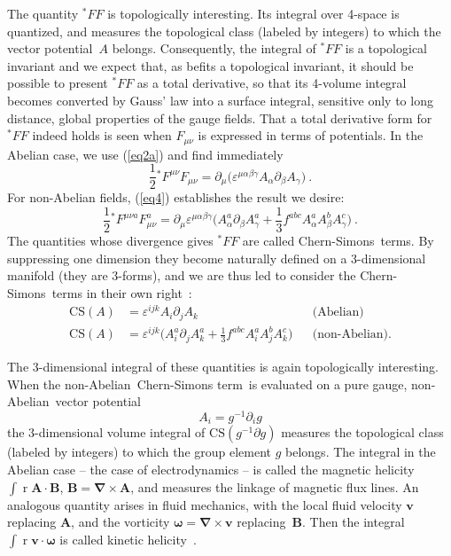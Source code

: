 \documentclass[a4paper,12pt,twoside]{article}
\newcommand{\rd}[1]{\mathop{\mathrm{d}#1}}
\newcommand{\fract}[2]{{\textstyle\frac{#1}{#2}}}
\newcommand{\grad}{\vec\nabla}
\newcommand{\nA}{non-Abelian}
\newcommand{\CS}{Chern-Simons}
\newcommand{\CSt}{Chern-Simons term}
\newcommand{\mn}{{\mu\nu}}
\newcommand{\pp}[1]{\partial_{#1}}
\newcommand{\numeq}[2]{\begin{equation}
#2
\label{#1}
\end{equation}}
\newcommand{\refeq}[1]{(\ref{#1})}
\let\vec\boldsymbol
\let\eps\varepsilon
\begin{document}
The quantity $ {}^*\!FF$ is topologically interesting. Its integral over 4-space is
quantized, and measures the topological class (labeled by integers) to which the
vector potential~$A$ belongs. Consequently, the  integral of $ {}^*\!FF$ is a
topological invariant and we expect that, as befits a topological invariant, it should be
possible to present
$ {}^*\!FF$ as a total derivative, so that its 4-volume integral becomes converted by
Gauss' law into a surface integral, sensitive only to long distance, global properties of
the gauge fields. That a total derivative form for
${}^*\!FF$ indeed holds is seen when $F_\mn$ is expressed in terms of potentials. In
the Abelian case, we use \refeq{eq2a} and find immediately  
\numeq{eq5}{
\fract12  {}^*\!F^\mn F_\mn  = \pp \mu \bigl(\eps^{\mu\alpha\beta\gamma}
A_\alpha \pp\beta A_\gamma \bigr)\ .
 }
For non-Abelian fields, \refeq{eq4} establishes the result we desire:
\numeq{eq6}{
\fract12 {}^*\!F^{\mn a} F_\mn^a   = \pp\mu \eps^{\mu\alpha\beta\gamma}
\bigl( A_\alpha^a\pp\beta A_\gamma^a + \fract13 f^{abc} A_\alpha^a A_\beta^b
A_\gamma^c
\bigr)\ .
}
The quantities whose divergence gives ${}^*\!FF$ are called \CS\ terms. By
suppressing one dimension they become naturally defined on a 3-dimensional
manifold (they are 3-forms), and we are thus led to consider the \CS\ terms in their
own right~\cite{ref7}:
\begin{align}
\mathrm{CS}(A) &= \eps^{ijk} A_i \pp j A_k & &\text{(Abelian)}\label{eq7}\\
\mathrm{CS}(A) &= \eps^{ijk}\bigl( A_i^a \pp j A_k^a +\fract13 f^{abc} A_i^a A_j^b
A_k^c \bigr)
 & &\text{(non-Abelian).}\label{eq8}
\end{align}

The 3-dimensional integral of these quantities is again topologically interesting. When
the
\nA\
\CSt\ is evaluated on a pure gauge, \nA\ vector potential
\numeq{eq9}{
A_i = g^{-1} \pp i g
} 
the 3-dimensional volume integral of $\mathrm{CS}(g^{-1} \partial  g)$ measures the
topological class (labeled by integers) to which the group element $g$ belongs. The
integral in the Abelian case -- the case of electrodynamics -- is called the magnetic
helicity
$\int
\rd{^3 r} \vec A\cdot
\vec B$,
$\vec B = \grad
\times \vec A$, and measures the linkage of magnetic flux lines. An analogous
quantity arises in fluid mechanics, with the local fluid velocity $\vec v$ replacing
$\vec A$, and the vorticity $\vec\omega = \grad\times\vec v$ replacing~$\vec B$. Then
the integral $\int \rd{^3 r} \vec v\cdot \vec\omega$ is called kinetic
helicity~\cite{ref8}.
\end{document}
